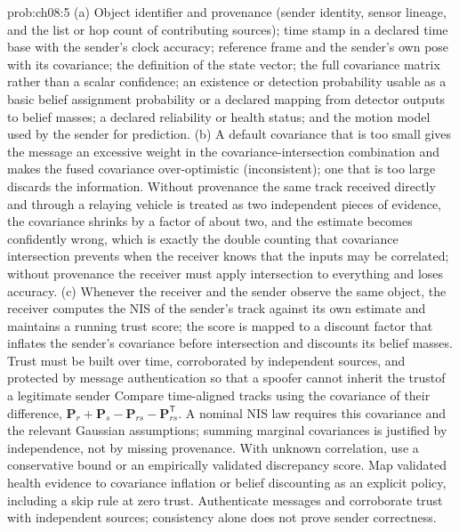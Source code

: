 \documentclass[graybox,envcountchap]{style/SNmono}
\providecommand{\DIFadd}[1]{{\protect\color{blue} #1}} %
\providecommand{\DIFdel}[1]{{\protect\color{red} #1}} %
\providecommand{\DIFaddbegin}{} %
\providecommand{\DIFaddend}{} %
\providecommand{\DIFdelbegin}{} %
\providecommand{\DIFdelend}{} %
\begin{document}
\begin{sol}{prob:ch08:5}
(a) Object identifier and provenance (sender identity, sensor lineage, and the list or hop count of contributing sources); time stamp in a declared time base with the sender's clock accuracy; reference frame and the sender's own pose with its covariance; the definition of the state vector; the full covariance matrix rather than a scalar confidence; an existence \DIFdelbegin \DIFdel{or detection probability usable as a basic belief assignment}\DIFdelend \DIFaddbegin \DIFadd{probability or a declared mapping from detector outputs to belief masses}\DIFaddend ; a declared reliability or health status; and the motion model used by the sender for prediction. (b) A default covariance that is too small gives the message an excessive weight in the covariance-intersection combination and makes the fused covariance over-optimistic (inconsistent); one that is too large discards the information. Without provenance the same track received directly and through a relaying vehicle is treated as two independent pieces of evidence, the covariance shrinks by a factor of about two, and the estimate becomes confidently wrong, which is exactly the double counting that covariance intersection prevents when the receiver knows that the inputs may be correlated; without provenance the receiver must apply intersection to everything and loses accuracy. (c) \DIFdelbegin \DIFdel{Whenever the receiver and the sender observe the same object, the receiver computes the NIS of the sender's track against its own estimate and maintains a running trust score; the score is mapped to a discount factor that inflates the sender's covariance before intersection and discounts its belief masses. Trust must be built over time, corroborated by independent sources, and protected by message authentication so that a spoofer cannot inherit the trustof a legitimate sender }\DIFdelend \DIFaddbegin \DIFadd{Compare time-aligned tracks using the covariance of their difference, $\mathbf{P}_r+\mathbf{P}_s-\mathbf{P}_{rs}-\mathbf{P}_{rs}^{\mathsf T}$. A nominal NIS law requires this covariance and the relevant Gaussian assumptions; summing marginal covariances is justified by independence, not by missing provenance. With unknown correlation, use a conservative bound or an empirically validated discrepancy score. Map validated health evidence to covariance inflation or belief discounting as an explicit policy, including a skip rule at zero trust. Authenticate messages and corroborate trust with independent sources; consistency alone does not prove sender correctness}\DIFaddend .
\end{sol}
\end{document}
